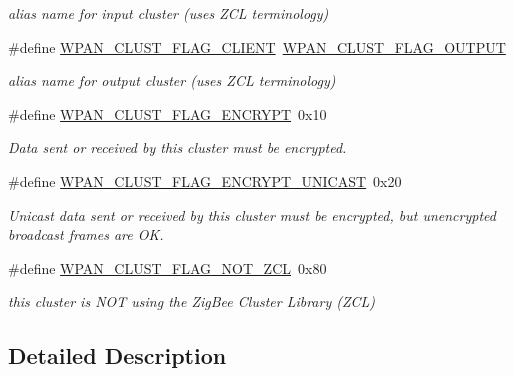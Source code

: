 \begin{DoxyCompactItemize}
\begin{DoxyCompactList}\small\item\em alias name for input cluster (uses Z\+CL terminology) \end{DoxyCompactList}\item 
\mbox{\label{group__wpan__aps_ga9aae0646b212af63cbb07c98a33cd986}} 
\#define \hyperlink{group__wpan__aps_ga9aae0646b212af63cbb07c98a33cd986}{W\+P\+A\+N\+\_\+\+C\+L\+U\+S\+T\+\_\+\+F\+L\+A\+G\+\_\+\+C\+L\+I\+E\+NT}~\hyperlink{group__wpan__aps_ga0456c33bdaa673f37f9285a3f5ca0172}{W\+P\+A\+N\+\_\+\+C\+L\+U\+S\+T\+\_\+\+F\+L\+A\+G\+\_\+\+O\+U\+T\+P\+UT}
\begin{DoxyCompactList}\small\item\em alias name for output cluster (uses Z\+CL terminology) \end{DoxyCompactList}\item 
\#define \hyperlink{group__wpan__aps_ga1eafd87038a2134da7a1f72e6801d23b}{W\+P\+A\+N\+\_\+\+C\+L\+U\+S\+T\+\_\+\+F\+L\+A\+G\+\_\+\+E\+N\+C\+R\+Y\+PT}~0x10
\begin{DoxyCompactList}\small\item\em Data sent or received by this cluster must be encrypted. \end{DoxyCompactList}\item 
\#define \hyperlink{group__wpan__aps_ga1ccfd85378afaa02de5c3f9c71c17df4}{W\+P\+A\+N\+\_\+\+C\+L\+U\+S\+T\+\_\+\+F\+L\+A\+G\+\_\+\+E\+N\+C\+R\+Y\+P\+T\+\_\+\+U\+N\+I\+C\+A\+ST}~0x20
\begin{DoxyCompactList}\small\item\em Unicast data sent or received by this cluster must be encrypted, but unencrypted broadcast frames are OK. \end{DoxyCompactList}\item 
\mbox{\label{group__wpan__aps_gacb0e365a8c5e72ee90be503513e7e630}} 
\#define \hyperlink{group__wpan__aps_gacb0e365a8c5e72ee90be503513e7e630}{W\+P\+A\+N\+\_\+\+C\+L\+U\+S\+T\+\_\+\+F\+L\+A\+G\+\_\+\+N\+O\+T\+\_\+\+Z\+CL}~0x80
\begin{DoxyCompactList}\small\item\em this cluster is N\+OT using the Zig\+Bee Cluster Library (Z\+CL) \end{DoxyCompactList}\end{DoxyCompactItemize}


\subsection{Detailed Description}


